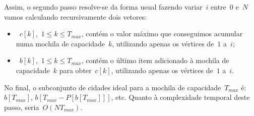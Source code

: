 \documentclass[12pt,a4paper,reqno]{report}
\numberwithin{equation}{section}
\begin{document}
Assim, o segundo passo resolve-se da forma usual fazendo variar~$i$ entre~$0$ e~$N$ vamos calculando recursivamente dois vetores:
\begin{itemize}
	\item~$c[k]$,~$1 \leq k \leq T_{max}$, contém o valor máximo que conseguimos acumular numa mochila de capacidade~$k$, utilizando apenas os vértices de~$1$ a~$i$;
	\item~$b[k]$,~$1 \leq k \leq T_{max}$, contém o último item adicionado à mochila de capacidade~$k$ para obter~$c[k]$, utilizando apenas os vértices de~$1$ a~$i$.
\end{itemize}

No final, o subconjunto de cidades ideal para a mochila de capacidade~$T_{max}$ é: $b[T_{max}]$, $b[T_{max}-P[b[T_{max}]]]$, etc. Quanto à complexidade temporal deste passo, seria~$O(NT_{max})$.
\end{document}
